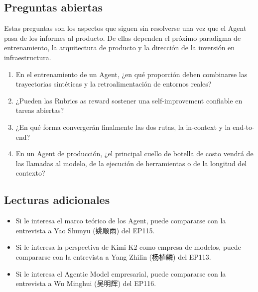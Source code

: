 \documentclass[a4paper]{article}
\begin{document}
\subsection{Preguntas abiertas}

Estas preguntas son los aspectos que siguen sin resolverse una vez que el Agent pasa de los informes al producto. De ellas dependen el próximo paradigma de entrenamiento, la arquitectura de producto y la dirección de la inversión en infraestructura.

\begin{enumerate}
\item En el entrenamiento de un Agent, ¿en qué proporción deben combinarse las trayectorias sintéticas y la retroalimentación de entornos reales?
\item ¿Pueden las Rubrics as reward sostener una self-improvement confiable en tareas abiertas?
\item ¿En qué forma convergerán finalmente las dos rutas, la in-context y la end-to-end?
\item En un Agent de producción, ¿el principal cuello de botella de costo vendrá de las llamadas al modelo, de la ejecución de herramientas o de la longitud del contexto?
\end{enumerate}

\subsection{Lecturas adicionales}

\begin{itemize}
\item Si le interesa el marco teórico de los Agent, puede compararse con la entrevista a Yao Shunyu (姚顺雨) del EP115.
\item Si le interesa la perspectiva de Kimi K2 como empresa de modelos, puede compararse con la entrevista a Yang Zhilin (杨植麟) del EP113.
\item Si le interesa el Agentic Model empresarial, puede compararse con la entrevista a Wu Minghui (吴明辉) del EP116.
\end{itemize}
\end{document}
